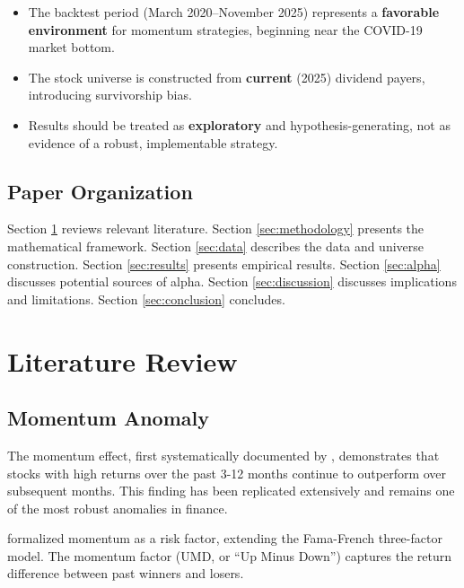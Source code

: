 \documentclass[12pt,a4paper]{article}
\theoremstyle{definition}
\begin{document}
\begin{itemize}
    \item The backtest period (March 2020--November 2025) represents a \textbf{favorable environment} for momentum strategies, beginning near the COVID-19 market bottom.
    \item The stock universe is constructed from \textbf{current} (2025) dividend payers, introducing survivorship bias.
    \item Results should be treated as \textbf{exploratory} and hypothesis-generating, not as evidence of a robust, implementable strategy.
\end{itemize}

\subsection{Paper Organization}

Section \ref{sec:literature} reviews relevant literature. Section \ref{sec:methodology} presents the mathematical framework. Section \ref{sec:data} describes the data and universe construction. Section \ref{sec:results} presents empirical results. Section \ref{sec:alpha} discusses potential sources of alpha. Section \ref{sec:discussion} discusses implications and limitations. Section \ref{sec:conclusion} concludes.

\section{Literature Review}
\label{sec:literature}

\subsection{Momentum Anomaly}

The momentum effect, first systematically documented by \citet{jegadeesh1993returns}, demonstrates that stocks with high returns over the past 3-12 months continue to outperform over subsequent months. This finding has been replicated extensively and remains one of the most robust anomalies in finance.

\citet{carhart1997persistence} formalized momentum as a risk factor, extending the Fama-French three-factor model. The momentum factor (UMD, or ``Up Minus Down'') captures the return difference between past winners and losers.
\end{document}
